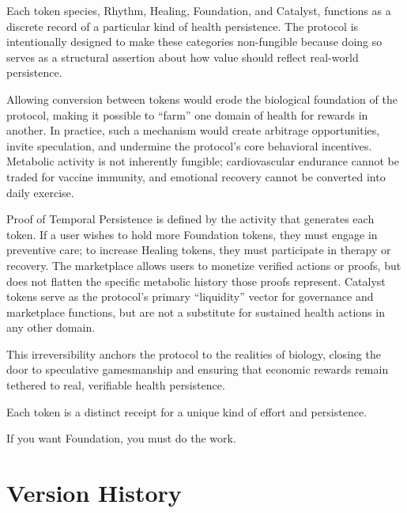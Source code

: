 \documentclass[11pt,letterpaper]{article}
\begin{document}
Each token species, Rhythm, Healing, Foundation, and Catalyst, functions as a discrete record of a particular kind of health persistence. The protocol is intentionally designed to make these categories non-fungible because doing so serves as a structural assertion about how value should reflect real-world persistence.

Allowing conversion between tokens would erode the biological foundation of the protocol, making it possible to “farm” one domain of health for rewards in another. In practice, such a mechanism would create arbitrage opportunities, invite speculation, and undermine the protocol’s core behavioral incentives. Metabolic activity is not inherently fungible; cardiovascular endurance cannot be traded for vaccine immunity, and emotional recovery cannot be converted into daily exercise.

Proof of Temporal Persistence is defined by the activity that generates each token. If a user wishes to hold more Foundation tokens, they must engage in preventive care; to increase Healing tokens, they must participate in therapy or recovery. The marketplace allows users to monetize verified actions or proofs, but does not flatten the specific metabolic history those proofs represent. Catalyst tokens serve as the protocol’s primary “liquidity” vector for governance and marketplace functions, but are not a substitute for sustained health actions in any other domain.

This irreversibility anchors the protocol to the realities of biology, closing the door to speculative gamesmanship and ensuring that economic rewards remain tethered to real, verifiable health persistence.

Each token is a distinct receipt for a unique kind of effort and persistence.

If you want Foundation, you must do the work.



\section{Version History}
\end{document}

